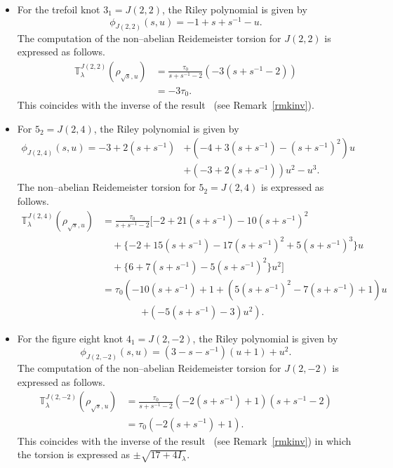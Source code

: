 \documentclass[a4paper]{amsart}
\theoremstyle{plain}
\theoremstyle{definition}
\theoremstyle{remark}
\begin{document}
\begin{itemize}
\item[(1)]
    For the trefoil knot $3_1 = J(2, 2)$, the Riley polynomial is given by 
    $$\phi_{J(2, 2)}(s, u) = -1 + s+s^{-1} - u.$$
    The computation of the non--abelian Reidemeister torsion for $J(2, 2)$ is expressed as follows.
    \begin{align*}
        {\mathbb T}^{J(2, 2)}_{\lambda}(\rho_{\sqrt{s}, u}) 
            &= \frac{\tau_0}{s + s^{-1} -2} \left(-3(s+s^{-1}-2)\right) \\
            &= -3 \tau_0.
    \end{align*}
    This coincides with the inverse of the result~\cite[Subsection~6.1]{JDFibre} (see Remark~\ref{rmkinv}).
\item[(2)]
    For $5_2 = J(2, 4)$, the Riley polynomial is given by 
    \begin{align*}
    \phi_{J(2, 4)}(s, u) =-3+2(s+s^{-1}) &+\left(-4+3(s+s^{-1})-(s+s^{-1})^2\right)u \\ &+ \left(-3+2(s+s^{-1})\right) u^2 - u^3.
    \end{align*}
    The non--abelian Reidemeister torsion for $5_2 = J(2, 4)$ is expressed as follows.
    \begin{align*}
        {\mathbb T}^{J(2, 4)}_{\lambda}(\rho_{\sqrt{s}, u}) 
            &= \frac{\tau_0}{s + s^{-1} -2}  
                   [ -2 + 21(s+s^{-1})-10(s+s^{-1})^2 \\
            &\quad
                    +\{-2+15(s+s^{-1})-17(s+s^{-1})^2+5(s+s^{-1})^3\}u \\
            &\quad
                    +\{6+7(s+s^{-1})-5(s+s^{-1})^2\}u^2 ]\\
            &=\tau_0
              \left(-10(s+s^{-1})+1
                +\left(5(s+s^{-1})^2-7(s+s^{-1})+1\right)u \right.\\
            &\qquad\qquad
               \left.+\left(-5(s+s^{-1})-3\right)u^2
               \right).
    \end{align*}
\item[(3)]
    For the figure eight knot $4_1 = J(2, -2)$, the Riley polynomial is given by  $$\phi_{J(2, -2)}(s, u)=(3-s-s^{-1})(u+1)+u^2.
    $$
    The computation of the non--abelian Reidemeister torsion for $J(2, -2)$ is expressed as follows.
    \begin{align*}
        {\mathbb T}^{J(2, -2)}_{\lambda}(\rho_{\sqrt{s}, u}) 
            &= \frac{\tau_0}{s+s^{-1}-2} \left(-2(s+s^{-1})+1\right)\left(s+s^{-1} -2\right) \\
            &= \tau_0 \left(-2(s+s^{-1})+1\right).
    \end{align*}
    This coincides with the inverse of the result~\cite[Subsection 6.3]{JDFibre} (see Remark~\ref{rmkinv}) in which the torsion is expressed as $\pm \sqrt{17 + 4I_{\lambda}} $. 
    

\end{itemize}
\end{document}

